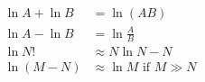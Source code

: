 \begin{align*}
\ln{A} + \ln{B} &= \ln{\left(AB\right)}\\
\ln{A} -\ln{B} &= \ln{\frac{A}{B}}\\
\ln{N!}&\approx N \ln{N}-N\\
\ln{\left(M-N\right)}&\approx \ln{M}\textrm{ if }M \gg N\\
\end{align*}